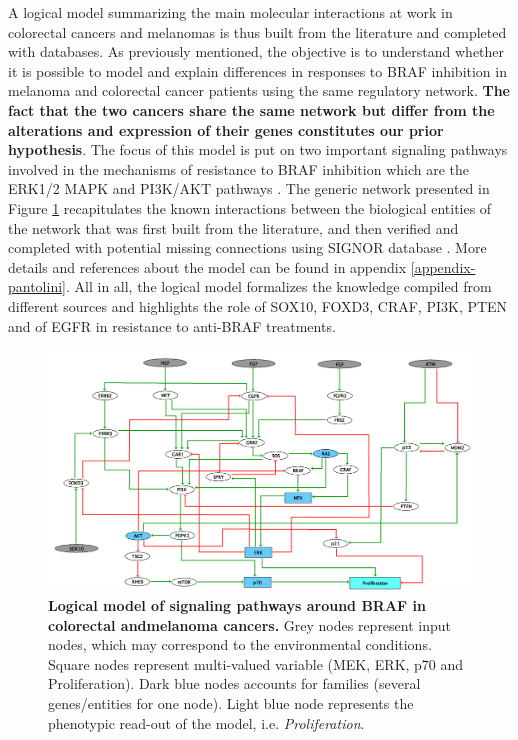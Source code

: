 \documentclass[a4paper,12pt,twoside,onecolumn,openright,final,oldfontcommands]{memoir}
\begin{document}
A logical model summarizing the main molecular interactions at work in
colorectal cancers and melanomas is thus built from the literature and
completed with databases. As previously mentioned, the objective is to
understand whether it is possible to model and explain differences in
responses to BRAF inhibition in melanoma and colorectal cancer patients
using the same regulatory network. \textbf{The fact that the two cancers
share the same network but differ from the alterations and expression of
their genes constitutes our prior hypothesis}. The focus of this model
is put on two important signaling pathways involved in the mechanisms of
resistance to BRAF inhibition which are the ERK1/2 MAPK and PI3K/AKT
pathways \citep{ursem2018emerging, rossi2019drug}. The generic network
presented in Figure \ref{fig:BRAF-model} recapitulates the known
interactions between the biological entities of the network that was
first built from the literature, and then verified and completed with
potential missing connections using SIGNOR database
\citep{perfetto2016signor}. More details and references about the model
can be found in appendix \ref{appendix-pantolini}. All in all, the
logical model formalizes the knowledge compiled from different sources
and highlights the role of SOX10, FOXD3, CRAF, PI3K, PTEN and of EGFR in
resistance to anti-BRAF treatments.

\begin{figure}

{\centering \includegraphics[width=0.9\linewidth]{fig/BRAF-model} 

}

\caption[Bimodality criteria and their combinations]{\textbf{Logical model of signaling pathways
around BRAF in colorectal andmelanoma cancers.} Grey nodes represent
input nodes, which may correspond to the environmental conditions.
Square nodes represent multi-valued variable (MEK, ERK, p70 and
Proliferation). Dark blue nodes accounts for families (several
genes/entities for one node). Light blue node represents the phenotypic
read-out of the model, i.e. \emph{Proliferation}.}\label{fig:BRAF-model}
\end{figure}
\end{document}
